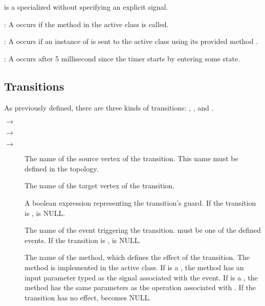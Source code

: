  is a specialized  without specifying an explicit signal.

\noindent
{}

: A  occurs if the method  in the active class is called.

: A  occurs if an instance of  is sent to the active class using its provided method .

: A  occurs after 5 millisecond since the timer starts by entering some state.

\subsection{Transitions}
As previously defined, there are three kinds of transitions: , , and .

\noindent
{}

\noindent
{} $\rightarrow$  

\noindent
{}$\rightarrow$

\noindent
{} $\rightarrow$ 

\noindent
{}
\begin{description}
	\item[] The name of the source vertex of the transition. 
	This name must be defined in the topology.
	
	\item[] The name of the target vertex of the transition. 
	
	\item[] A boolean expression representing the transition's guard. If the transition is ,  is NULL.
	
	\item[] The name of the event triggering the transition. 
	 must be one of the defined events. 
	If the transition is ,  is NULL.
	
	\item[] The name of the method, which defines the effect of the transition.
	The method is implemented in the active class.
	If  is a , the method has an input parameter typed as the signal associated with the event.
	If  is a , the method has the same parameters as the operation associated with .
	If the transition has no effect,  becomes NULL.
\end{description}

\noindent
{}